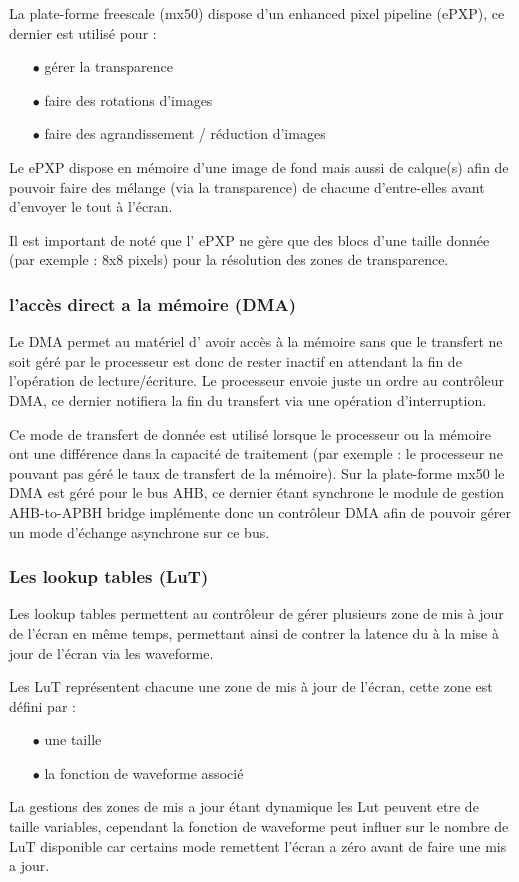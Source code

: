 La plate-forme freescale (mx50) dispose d'un enhanced pixel pipeline (ePXP), ce dernier est utilisé pour : 
	\begin{itemize}
		\item[$\bullet$] gérer la transparence
		\item[$\bullet$] faire des rotations d'images
		\item[$\bullet$] faire des agrandissement / réduction d'images\\
	\end{itemize}

Le ePXP dispose en mémoire d'une image de fond mais aussi de calque(s) afin de pouvoir faire des 
mélange (via la transparence) de chacune d'entre-elles avant d'envoyer le tout à l'écran.

Il est important de noté que l' ePXP ne gère que des blocs d'une taille donnée (par exemple : 8x8 pixels) pour la résolution des zones de transparence.

\subsubsection{l'accès direct a la mémoire (DMA)}

Le DMA permet au matériel d' avoir accès à la mémoire sans que le transfert ne soit géré par le processeur est donc de rester inactif en attendant la fin de l'opération de lecture/écriture.
Le processeur envoie juste un ordre au contrôleur DMA, ce dernier notifiera la fin du transfert via une opération d'interruption.

Ce mode de transfert de donnée est utilisé lorsque le processeur ou la mémoire ont une différence dans la capacité de traitement (par exemple : le processeur ne pouvant pas géré le taux de transfert de la mémoire).
Sur la plate-forme mx50 le DMA est géré pour le bus AHB, ce dernier étant synchrone le module de gestion AHB-to-APBH bridge implémente donc un contrôleur DMA afin de pouvoir gérer un mode d'échange asynchrone sur ce bus.

\subsubsection{Les lookup tables (LuT)}

Les lookup tables permettent au contrôleur de gérer plusieurs zone de mis à jour de l'écran en même temps, permettant ainsi de contrer la latence du à la mise à jour de l'écran via les waveforme.

Les LuT représentent chacune une zone de mis à jour de l'écran, cette zone est défini par : 
	\begin{itemize}
		\item[$\bullet$] une taille
		\item[$\bullet$] la fonction de waveforme associé
	\end{itemize}
La gestions des zones de mis a jour étant dynamique les Lut peuvent etre de taille variables, cependant la fonction de waveforme peut influer sur le nombre de LuT disponible car certains mode remettent l'écran a zéro avant de faire une mis a jour.

